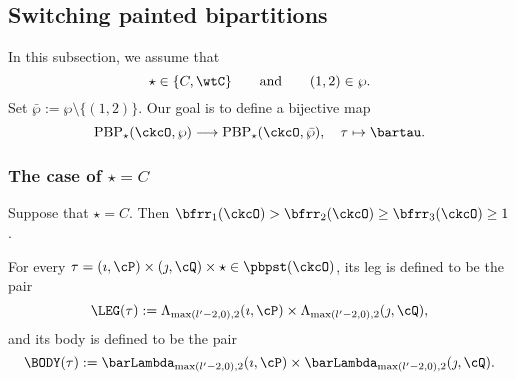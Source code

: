 \documentclass[ssunip]{subfiles}
\begin{document}
   
\subsection{Switching painted bipartitions}

  In  this subsection, we assume that 
  \[
  \star\in \{C, \wtC\}\qquad \textrm{and}\qquad  (1,2)\in \wp.
  \]
  Set $\bar \wp:=\wp\setminus\{(1,2)\}$. 
  Our goal is to define a bijective map
 \[
 \mathrm{PBP}_\star(\ckcO, \wp )\longrightarrow \mathrm{PBP}_\star(\ckcO, \bar\wp), \quad
 \tau \mapsto \bartau. 
 \]

  
\subsubsection{The case of $\star=C$}


Suppose that $\star=C$. Then $\bfrr_1(\ckcO)>\bfrr_2(\ckcO)\geq \bfrr_3(\ckcO)\geq 1$.

For every $\tau= (\imath,\cP)\times(\jmath,\cQ)\times \star\in \pbpst(\ckcO)$, 
 its  leg is defined to be  the  pair
\[
\LEG(\tau) := \Lambda_{\max(l'-2,0),2}(\imath,\cP)\times \Lambda_{\max(l'-2,0),2}(\jmath,\cQ),
\]
and its body is defined to be the pair 
\[
\BODY(\tau) := 
\barLambda_{\max(l'-2,0),2}(\imath,\cP)\times \barLambda_{\max(l'-2,0),2}(\jmath,\cQ).
\]
  
\end{document}
